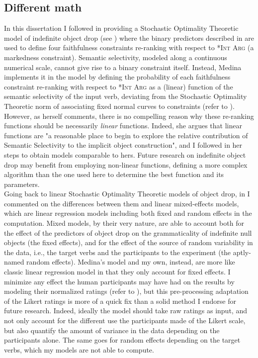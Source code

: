 

\subsection{Different math}

In this dissertation I followed \textcite{Medina2007} in providing a Stochastic Optimality Theoretic model of indefinite object drop (see ) where the binary predictors described in  are used to define four faithfulness constraints re-ranking with respect to \textsc{*Int Arg} (a markedness constraint). Semantic selectivity, modeled along a continuous numerical scale, cannot give rise to a binary constraint itself. Instead, Medina implements it in the model by defining the probability of each faithfulness constraint re-ranking with respect to \textsc{*Int Arg} as a (linear) function of the semantic selectivity of the input verb, deviating from the Stochastic Optimality Theoretic norm of associating fixed normal curves to constraints (refer to ). However, as \textcite[110]{Medina2007} herself comments, there is no compelling reason why these re-ranking functions should be necessarily \textit{linear} functions. Indeed, she argues that linear functions are "a reasonable place to begin to explore the relative contribution of
Semantic Selectivity to the implicit object construction", and I followed in her steps to obtain models comparable to hers. Future research on indefinite object drop may benefit from employing non-linear functions, defining a more complex algorithm than the one used here to determine the best function and its parameters.\\
Going back to linear Stochastic Optimality Theoretic models of object drop, in  I commented on the differences between them and linear mixed-effects models, which are linear regression models including both fixed and random effects in the computation. Mixed models, by their very nature, are able to account both for the effect of the predictors of object drop on the grammaticality of indefinite null objects (the fixed effects), and for the effect of the source of random variability in the data, i.e., the target verbs and the participants to the experiment (the aptly-named random effects). Medina's model and my own, instead, are more like classic linear regression model in that they only account for fixed effects. I minimize any effect the human participants may have had on the results by modeling their normalized ratings (refer to ), but this pre-processing adaptation of the Likert ratings is more of a quick fix than a solid method I endorse for future research. Indeed, ideally the model should take raw ratings as input, and not only account for the different use the participants made of the Likert scale, but also quantify the amount of variance in the data depending on the participants alone. The same goes for random effects depending on the target verbs, which my models are not able to compute.

